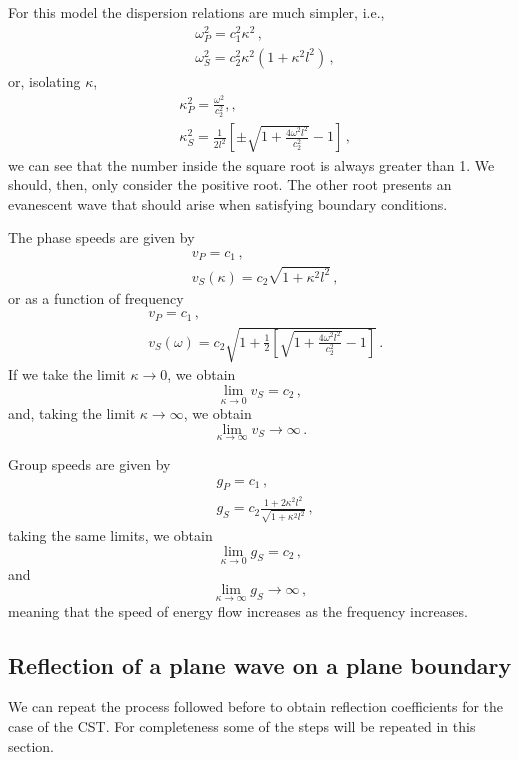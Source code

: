 \documentclass[12pt]{article}
\begin{document}
For this model the dispersion relations are much simpler, i.e.,
\begin{align*}
&\omega_P^2 = c_1^2 \kappa^2\, ,\\
&\omega_S^2 = c_2^2 \kappa^2 (1 + \kappa^2 l^2)\, ,
\end{align*}
or, isolating \(\kappa\),
\begin{align*}
&\kappa_P^2 = \frac{\omega^2}{c_2^2}, ,\\
&\kappa_S^2 = \frac{1}{2 l^2}\left[\pm\sqrt{1 + \frac{4\omega^2 l^2}{c_2^2}} - 1\right]\, ,
\end{align*}
we can see that the number inside the square root is always greater than 1. We should, then, only consider the positive root. The other root presents an evanescent wave that should arise when satisfying boundary conditions.

The phase speeds are given by
\begin{align*}
&v_P = c_1\, ,\\
&v_S(\kappa) = c_2\sqrt{1 + \kappa^2 l^2}\, ,
\end{align*}
or as a function of frequency
\begin{align*}
&v_P = c_1\, ,\\
&v_S(\omega) = c_2\sqrt{1 + \frac{1}{2}\left[\sqrt{1 + \frac{4\omega^2 l^2}{c_2^2}} - 1\right]}\, .
\end{align*}
If we take the limit \(\kappa \rightarrow 0\), we obtain
\[\lim_{\kappa \rightarrow 0} v_S = c_2\, ,\]
and, taking the limit \(\kappa \rightarrow \infty\), we obtain
\[\lim_{\kappa \rightarrow \infty} v_S \rightarrow  \infty\, .\]

Group speeds are given by
\begin{align*}
&g_P = c_1\, ,\\
&g_S = c_2 \frac{1 + 2\kappa^2 l^2}{\sqrt{1 + \kappa^2 l^2}}\, ,
\end{align*}
taking the same limits, we obtain
\[\lim_{\kappa \rightarrow 0} g_S = c_2\, ,\]
and
\[\lim_{\kappa \rightarrow \infty} g_S \rightarrow  \infty\, ,\]
meaning that the speed of energy flow increases as the frequency increases.

\subsection{Reflection of a plane wave on a plane boundary}

We can repeat the process followed before to obtain reflection coefficients for the case of the CST. For completeness some of the steps will be repeated in this section.
\end{document}
